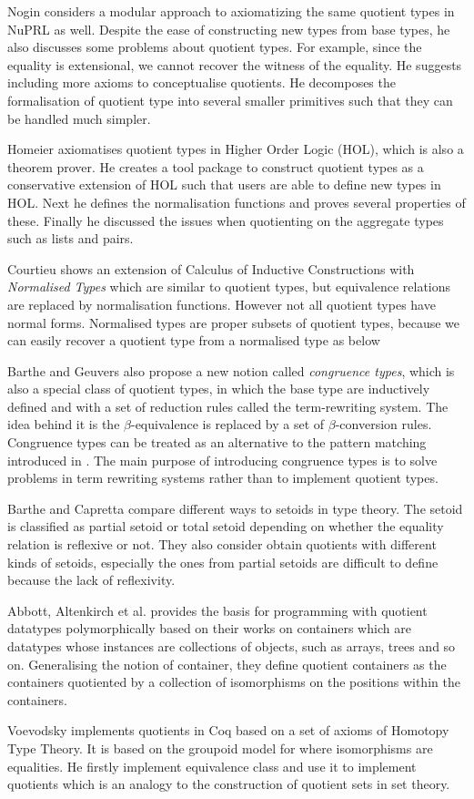 Nogin \cite{nog:02} considers a modular approach to axiomatizing the
same quotient types in NuPRL as well. Despite the ease of constructing new types
from base types, he also discusses some
problems about quotient types. For example, since the equality is
extensional, we cannot recover the
witness of the equality.  He suggests including more axioms to
conceptualise quotients. He decomposes the formalisation of quotient type
into several smaller primitives such that they can be handled much
simpler.

Homeier \cite{hom} axiomatises quotient types in Higher Order Logic
(HOL), which is also a theorem prover. He creates a tool package to
construct quotient types as a conservative extension of HOL such that
users are able to define new types in HOL. Next he defines the
normalisation functions and proves several properties of
these. Finally he discussed the issues when quotienting on the
aggregate types such as lists and pairs.


Courtieu \cite{cou:01} shows an extension of Calculus of Inductive Constructions
with \emph{Normalised Types} which are similar to quotient types, but equivalence relations are replaced by normalisation functions. 
However not all quotient types have normal forms. Normalised types are
proper subsets of quotient types, because we can easily recover a quotient
type from a normalised type as below


Barthe and Geuvers \cite{bar:96} also propose a new notion called
\emph{congruence types}, which is also a special class of quotient
types, in which the base type are inductively defined and with a set
of reduction rules called the term-rewriting system. The idea behind
it is the $\beta$-equivalence is replaced by a set of
$\beta$-conversion rules. Congruence types can be treated as an
alternative to the pattern matching introduced in \cite{coq:92}. The main
purpose of introducing congruence types is to solve problems in
term rewriting systems rather than to implement quotient types.


Barthe and Capretta \cite{bar:03} compare different ways to setoids in type theory.
The setoid is classified as partial setoid or total setoid depending
on whether the equality relation is reflexive or not. They also
consider obtain quotients with different kinds of setoids, especially
the ones from partial setoids are difficult to define because the lack
of reflexivity.

Abbott, Altenkirch et al. \cite{abb:04} provides the basis for
programming with quotient datatypes polymorphically based on their
works on containers which are datatypes whose instances are
collections of objects, such as arrays, trees and so on. Generalising
the notion of container, they define quotient containers as the
containers quotiented by a collection of isomorphisms on the positions
within the containers.

Voevodsky \cite{voe:hset} implements quotients in Coq based on a set
of axioms of Homotopy Type Theory. It is based on the groupoid model
for \itt{} where isomorphisms are equalities. He firstly implement
equivalence class and use it to implement quotients which is an
analogy to the construction of quotient sets in set theory. 
